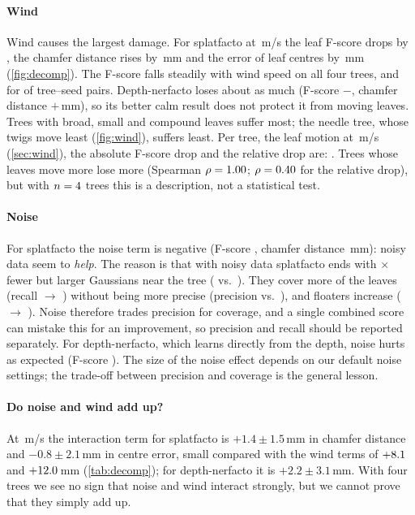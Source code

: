 \documentclass[preprint,11pt,authoryear]{elsarticle}
\begin{document}
\paragraph{Wind} Wind causes the largest damage. For splatfacto at \WindMax\,m/s the leaf F-score drops by \SpWindHiF{}, the chamfer distance rises by \SpWindHiCD\,mm and the error of leaf centres by \SpWindHiCentroid\,mm (\cref{fig:decomp}). The F-score falls steadily with wind speed on all four trees, and for \SpMonoCount{} of \SpMonoTotal{} tree--seed pairs. Depth-nerfacto loses about as much (F-score $-$\NfWindHiF{}, chamfer distance $+$\NfWindHiCD\,mm), so its better calm result does not protect it from moving leaves. Trees with broad, small and compound leaves suffer most; the needle tree, whose twigs move least (\cref{fig:wind}), suffers least. Per tree, the leaf motion at \WindMax\,m/s (\cref{sec:wind}), the absolute F-score drop and the relative drop are: \MotionDropList. Trees whose leaves move more lose more (Spearman $\rho = 1.00$; $\rho = 0.40$ for the relative drop), but with $n = 4$ trees this is a description, not a statistical test.

\paragraph{Noise} For splatfacto the noise term is negative (F-score \SpSensorF{}, chamfer distance \SpSensorCD\,mm): noisy data seem to \emph{help}. The reason is that with noisy data splatfacto ends with \SpGaussRatio$\times$ fewer but larger Gaussians near the tree (\SpGaussNoisy{} vs.\ \SpGaussClean{}). They cover more of the leaves (recall \SpRecClean{} $\to$ \SpRecNoisy{}) without being more precise (precision \SpPrecClean{} vs.\ \SpPrecNoisy{}), and floaters increase (\SpFloatClean{} $\to$ \SpFloatNoisy{}). Noise therefore trades precision for coverage, and a single combined score can mistake this for an improvement, so precision and recall should be reported separately. For depth-nerfacto, which learns directly from the depth, noise hurts as expected (F-score \NfSensorF{}). The size of the noise effect depends on our default noise settings; the trade-off between precision and coverage is the general lesson.

\paragraph{Do noise and wind add up?} At \WindMax\,m/s the interaction term for splatfacto is $+1.4 \pm 1.5$\,mm in chamfer distance and $-0.8 \pm 2.1$\,mm in centre error, small compared with the wind terms of $+8.1$ and $+12.0$\,mm (\cref{tab:decomp}); for depth-nerfacto it is $+2.2 \pm 3.1$\,mm. With four trees we see no sign that noise and wind interact strongly, but we cannot prove that they simply add up.
\end{document}
